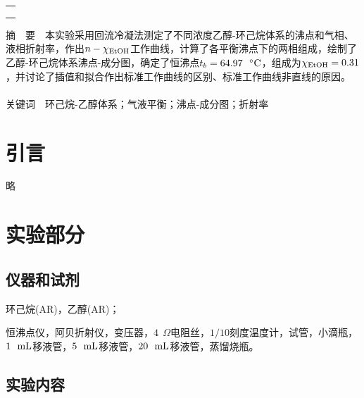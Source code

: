 \documentclass[12pt]{article}
\begin{document}
\begin{titlepage}
\begin{center}
            \begin{tabular*}{\textwidth}{c}
                \\ %
                \\ %
                \\ %
                \\ %
                \hline %
            \end{tabular*}
        \end{center}
        \textsf{摘\ \ 要}\ \ 本实验采用回流冷凝法测定了不同浓度乙醇-环己烷体系的沸点和气相、液相折射率，作出$n-\chi_{\ce{EtOH}}$工作曲线，计算了各平衡沸点下的两相组成，绘制了乙醇-环己烷体系沸点-成分图，确定了恒沸点$t_{b}=64.97\ \ {\rm ^{\circ}C}$，组成为$\chi_{\ce{EtOH}}=0.31$，并讨论了插值和拟合作出标准工作曲线的区别、标准工作曲线非直线的原因。
        \\
        \\
        \textsf{关键词}\ \ 环己烷-乙醇体系；气液平衡；沸点-成分图；折射率
    \end{titlepage}

    \section{引言}
	略
               
\vbox{}        
    \section{实验部分}
    	\subsection{仪器和试剂}
环己烷(AR)，乙醇(AR)；\par 
恒沸点仪，阿贝折射仪，变压器，$4\ \ \Omega$电阻丝，$1/10$刻度温度计，试管，小滴瓶，$1\ \ {\rm mL}$移液管，$5\ \ {\rm mL}$移液管，$20\ \ {\rm mL}$移液管，蒸馏烧瓶。
     
\vbox{}
    	 \subsection{实验内容\citealp{physchemlab}}
\end{document}
